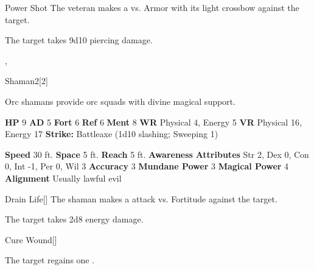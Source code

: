     \begin{freeability}{Power Shot}
       The veteran makes a 
         vs. Armor
        with its light crossbow against the target.
    
    \hit The target takes 9d10 piercing damage.
    \end{freeability}
  ,
  \begin{monsubsection}{Shaman}{2}[2]
    \vspace{-1em}\vspace{-1em}
    \vspace{0em}

    
        Orc shamans provide orc squads with divine magical support.
      
    

    \begin{spellcontent}
      \begin{spelltargetinginfo}
        \pari \textbf{HP} 9 \monsep
          \textbf{AD} 5 \monsep
          \textbf{Fort} 6 \monsep
          \textbf{Ref} 6 \monsep
          \textbf{Ment} 8
        \pari \textbf{WR} Physical 4, Energy 5 \monsep
        \textbf{VR} Physical 16, Energy 17
        \pari \textbf{Strike:}
            Battleaxe  (1d10 slashing; Sweeping 1)
      \end{spelltargetinginfo}
    \end{spellcontent}
    \begin{monsterfooter}
      \pari \textbf{Speed} 30 ft. \monsep
        \textbf{Space} 5 ft. \monsep
        \textbf{Reach} 5 ft.
      \pari \textbf{Awareness} 
      \pari \textbf{Attributes}
        Str 2, Dex 0,
        Con 0, Int -1,
        Per 0, Wil 3
      \pari \textbf{Accuracy} 3 \monsep
        \textbf{Mundane Power} 3 \monsep
      \textbf{Magical Power} 4
      \pari \textbf{Alignment} Usually lawful evil
    \end{monsterfooter}
  \end{monsubsection}
  \begin{freeability}{Drain Life}[]
       The shaman makes a  attack
        vs. Fortitude against the target.
    
    \hit The target takes 2d8 energy damage.
    \end{freeability}
  
      
    \begin{freeability}{Cure Wound}[]
      
            The target regains one .
          
    \end{freeability}
  
